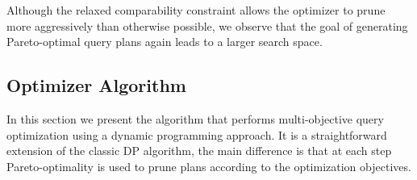 Although the relaxed comparability constraint allows the optimizer to
prune more aggressively than otherwise possible, we observe that the
goal of generating Pareto-optimal query plans again leads to a larger
search space.

\subsection{Optimizer Algorithm}

In this section we present the algorithm that performs multi-objective
query optimization using a dynamic programming approach. It is a
straightforward extension of the classic DP algorithm, the main
difference is that at each step Pareto-optimality is used to prune
plans according to the optimization objectives.






